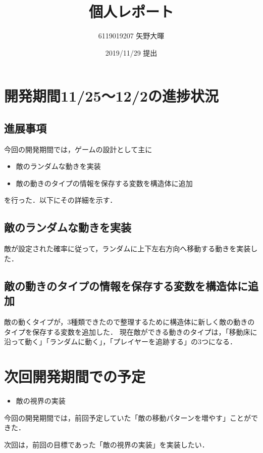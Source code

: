\documentclass{jarticle}
\title{個人レポート}
\author{6119019207 矢野大暉}
\date{2019/11/29 提出}
\newcommand{\xe}{敵のランダムな動きを実装}
\newcommand{\xf}{敵の動きのタイプの情報を保存する変数を構造体に追加}
\newcommand{\pitem}[2]{
\item #1
\item #2
}
\begin{document}
\maketitle

\section{開発期間11/25～12/2の進捗状況} 
\subsection{進展事項}
今回の開発期間では，ゲームの設計として主に
\begin{itemize}
\pitem{\xe}{\xf}
\end{itemize}
を行った．以下にその詳細を示す．

\subsection{\xe}
敵が設定された確率に従って，ランダムに上下左右方向へ移動する動きを実装した．

\subsection{\xf}
敵の動くタイプが，3種類できたので整理するために構造体に新しく敵の動きのタイプを保存する変数を追加した．
現在敵ができる動きのタイプは，「移動床に沿って動く」「ランダムに動く」，「プレイヤーを追跡する」の3つになる．

\section{次回開発期間での予定}
\begin{itemize}
\item 敵の視界の実装
\end{itemize}

今回の開発期間では，前回予定していた「敵の移動パターンを増やす」ことができた．

次回は，前回の目標であった「敵の視界の実装」を実装したい．
\end{document}

